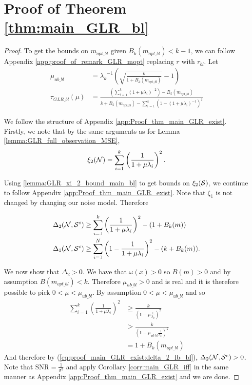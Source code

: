 \section{Proof of Theorem \ref{thm:main_GLR_bl}}
\label{app:GLR_bandlimited_thm}
\begin{proof}
To get the bounds on $m_{opt\_bl}$ given $B_{k}(m_{opt\_bl}) < k-1$, we can follow Appendix \ref{app:proof_of_remark_GLR_mopt} replacing $r$ with $r_{bl}$. Let
\begin{align} 
    \mu_{ub\_bl} &= {\lambda_{k}}^{-1}\left(\sqrt{\frac{k}{1 +B_{k}(m_{opt\_bl})}} -1\right)  \\
    \tau_{GLR\_bl}(\mu) &=  \frac{\left(\sum^{k}_{i=1}\left(1 + \mu\lambda_{i} \right)^{-2}\right) - B_{k}(m_{opt\_bl})}{k+B_{k}(m_{opt\_bl}) - \sum_{i=1}^{k} \left(1 - (1+\mu\lambda_{i})^{-1}\right)^{2}} 
\end{align}

We follow the structure of Appendix \ref{app:Proof_thm_main_GLR_exist}. Firstly, we note that by the same arguments as for Lemma \ref{lemma:GLR_full_observation_MSE},
\begin{align}
    \xi_{2}(\mathcal{N}) = \sum_{i=1}^{k} \left( \frac{1}{1+\mu\lambda_{i}} \right)^{2}.
\end{align}

Using \ref{lemma:GLR_xi_2_bound_main_bl} to get bounds on $\xi_{2}(\mathcal{S})$, we continue to follow Appendix \ref{app:Proof_thm_main_GLR_exist}. Note that $\xi_{1}$ is not changed by changing our noise model. Therefore

\begin{align}
    \Delta_{2}(\mathcal{N},\mathcal{S}^{c}) &\geq \sum_{i=1}^{k} \left( \frac{1}{1+\mu\lambda_{i}}\right)^{2} - (1+B_{k}(m)) \label{eq:proof_main_GLR_exist:delta_2_lb_bl} \\
    \Delta_{1}(\mathcal{N},\mathcal{S}^{c}) &\geq \sum_{i=1}^{N} \left(1 - \frac{1}{1+\mu\lambda_{i}}\right)^{2} - (k + B_{k}(m)) \label{eq:proof_main_GLR_exist:delta_1_lb_bl}.
\end{align}


We now show that $\Delta_{2} > 0$. We have that $\omega(x) > 0$ so $B(m) > 0$ and by assumption $B(m_{opt\_bl}) < k$. Therefore $\mu_{ub\_bl} > 0$ and is real and it is therefore possible to pick $0 < \mu < \mu_{ub\_bl}$.
By assumption $0<\mu<\mu_{ub\_bl}$ and so
\begin{align}
    \sum_{i=1}^{k}\left(\frac{1}{1 + \mu\lambda_{i}}\right)^{2} &\geq \frac{k}{\left(1+\mu\frac{1}{\lambda_{k}}  \right)^{2}}\\
    &> \frac{k}{\left(1+\mu_{ub\_bl}\frac{1}{\lambda_{k}} 
  \right)^{2}}\\ 
    &= 1 + B_{k}(m_{opt\_bl})
\end{align}
And therefore by (\ref{eq:proof_main_GLR_exist:delta_2_lb_bl}), $\Delta_{2}(\mathcal{N},\mathcal{S}^{c}) > 0$. Note that $\textrm{SNR} = \frac{1}{\sigma^{2}}$ and apply Corollary \ref{corr:main_GLR_iff} in the same manner as Appendix \ref{app:Proof_thm_main_GLR_exist} and we are done.
\end{proof}

